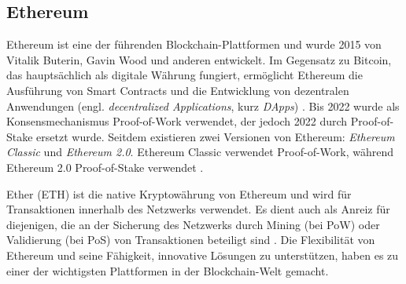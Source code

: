 \subsection{Ethereum}
\label{sec:ethereum_basics}

Ethereum ist eine der führenden Blockchain-Plattformen und wurde 2015 von Vitalik Buterin, Gavin Wood und anderen entwickelt. Im Gegensatz zu Bitcoin, das hauptsächlich als digitale Währung fungiert, ermöglicht Ethereum die Ausführung von Smart Contracts und die Entwicklung von dezentralen Anwendungen (engl. \textit{decentralized Applications}, kurz \textit{DApps}) \Parencites[S. 720]{Sorge_BitcoinZahlungsmittelDerZukunft}[S. 1-2]{Perez_SmartContractVulnerabilities}. Bis 2022 wurde als Konsensmechanismus Proof-of-Work verwendet, der jedoch 2022 durch Proof-of-Stake ersetzt wurde. Seitdem existieren zwei Versionen von Ethereum: \textit{Ethereum Classic} und \textit{Ethereum 2.0}. Ethereum Classic verwendet Proof-of-Work, während Ethereum 2.0 Proof-of-Stake verwendet \Parencite{EthereumClassic_ResearcherFAQs}.

Ether (ETH) ist die native Kryptowährung von Ethereum und wird für Transaktionen innerhalb des Netzwerks verwendet. Es dient auch als Anreiz für diejenigen, die an der Sicherung des Netzwerks durch Mining (bei PoW) oder Validierung (bei PoS) von Transaktionen beteiligt sind \parencite[S. 320-321]{Antonopoulos_MasteringEthereum}. Die Flexibilität von Ethereum und seine Fähigkeit, innovative Lösungen zu unterstützen, haben es zu einer der wichtigsten Plattformen in der Blockchain-Welt gemacht.
